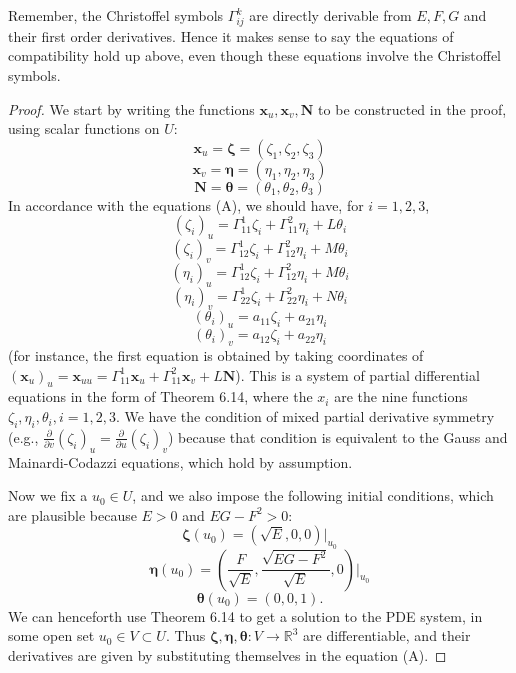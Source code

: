 \documentclass[leqno]{book}
\begin{document}
\noindent Remember, the Christoffel symbols $\Gamma_{ij}^k$ are directly derivable from $E,F,G$ and their first order derivatives.  Hence it makes sense to say the equations of compatibility hold up above, even though these equations involve the Christoffel symbols.
\begin{proof}
We start by writing the functions $\mathbf x_u,\mathbf x_v,\mathbf N$ to be constructed in the proof, using scalar functions on $U$:
$$\mathbf x_u=\boldsymbol\zeta=(\zeta_1,\zeta_2,\zeta_3)$$
$$\mathbf x_v=\boldsymbol\eta=(\eta_1,\eta_2,\eta_3)$$
$$\mathbf N=\boldsymbol\theta=(\theta_1,\theta_2,\theta_3)$$
In accordance with the equations (A), we should have, for $i=1,2,3$,
$$(\zeta_i)_u=\Gamma_{11}^1\zeta_i+\Gamma_{11}^2\eta_i+L\theta_i$$
$$(\zeta_i)_v=\Gamma_{12}^1\zeta_i+\Gamma_{12}^2\eta_i+M\theta_i$$
$$(\eta_i)_u=\Gamma_{12}^1\zeta_i+\Gamma_{12}^2\eta_i+M\theta_i$$
$$(\eta_i)_v=\Gamma_{22}^1\zeta_i+\Gamma_{22}^2\eta_i+N\theta_i$$
$$(\theta_i)_u=a_{11}\zeta_i+a_{21}\eta_i$$
$$(\theta_i)_v=a_{12}\zeta_i+a_{22}\eta_i$$
(for instance, the first equation is obtained by taking coordinates of $(\mathbf x_u)_u=\mathbf x_{uu}=\Gamma_{11}^1\mathbf x_u+\Gamma_{11}^2\mathbf x_v+L\mathbf N$).  This is a system of partial differential equations in the form of Theorem 6.14, where the $x_i$ are the nine functions $\zeta_i,\eta_i,\theta_i,i=1,2,3$.  We have the condition of mixed partial derivative symmetry (e.g., $\frac{\partial}{\partial v}(\zeta_i)_u=\frac{\partial}{\partial u}(\zeta_i)_v$) because that condition is equivalent to the Gauss and Mainardi-Codazzi equations, which hold by assumption.

Now we fix a $u_0\in U$, and we also impose the following initial conditions, which are plausible because $E>0$ and $EG-F^2>0$:
$$\boldsymbol\zeta(u_0)=(\sqrt E,0,0)\big|_{u_0}$$
$$\boldsymbol\eta(u_0)=\left(\frac F{\sqrt E},\frac{\sqrt{EG-F^2}}{\sqrt E},0\right)\big|_{u_0}$$
$$\boldsymbol\theta(u_0)=(0,0,1).$$
We can henceforth use Theorem 6.14 to get a solution to the PDE system, in some open set $u_0\in V\subset U$.  Thus $\boldsymbol\zeta,\boldsymbol\eta,\boldsymbol\theta:V\to\mathbb R^3$ are differentiable, and their derivatives are given by substituting themselves in the equation (A).


\end{proof}
\end{document}
